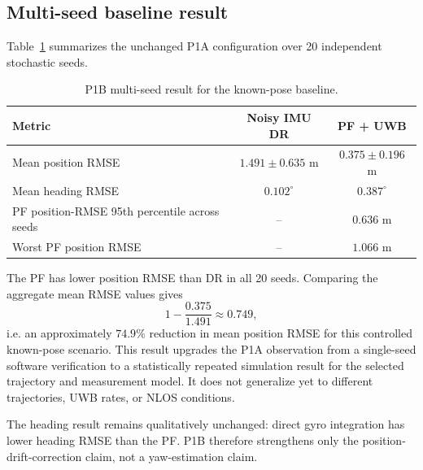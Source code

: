 \subsection{Multi-seed baseline result}
Table~\ref{tab:p1b_multiseed} summarizes the unchanged P1A configuration over 20 independent stochastic seeds.
\begin{table}[ht]
\centering
\caption{P1B multi-seed result for the known-pose baseline.}
\label{tab:p1b_multiseed}
\begin{tabular}{lcc}
\toprule
Metric & Noisy IMU DR & PF + UWB\\
\midrule
Mean position RMSE & $1.491\pm0.635$ m & $\mathbf{0.375\pm0.196}$ m\\
Mean heading RMSE & $\mathbf{0.102^\circ}$ & $0.387^\circ$\\
PF position-RMSE 95th percentile across seeds & -- & $0.636$ m\\
Worst PF position RMSE & -- & $1.066$ m\\
\bottomrule
\end{tabular}
\end{table}
The PF has lower position RMSE than DR in all 20 seeds. Comparing the aggregate mean RMSE values gives
\begin{equation}
1-\frac{0.375}{1.491}\approx0.749,
\end{equation}
i.e. an approximately $74.9\%$ reduction in mean position RMSE for this controlled known-pose scenario. This result upgrades the P1A observation from a single-seed software verification to a statistically repeated simulation result for the selected trajectory and measurement model. It does not generalize yet to different trajectories, UWB rates, or NLOS conditions.

The heading result remains qualitatively unchanged: direct gyro integration has lower heading RMSE than the PF. P1B therefore strengthens only the position-drift-correction claim, not a yaw-estimation claim.

